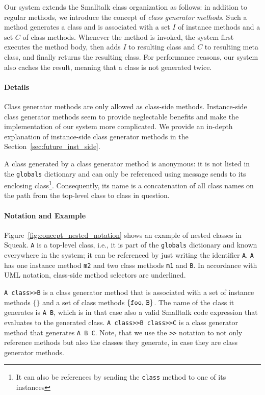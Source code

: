 Our system extends the Smalltalk class organization as follows: in addition to regular methods, we introduce the concept of \emph{class generator methods}. Such a method generates a class and is associated with a set $I$ of instance methods and a set $C$ of class methods. Whenever the method is invoked, the system first executes the method body, then adds $I$ to resulting class and $C$ to resulting meta class, and finally returns the resulting class. For performance reasons, our system also caches the result, meaning that a class is not generated twice.

\paragraph{Details}
Class generator methods are only allowed as class-side methods. Instance-side class generator methods seem to provide neglectable benefits and make the implementation of our system more complicated. We provide an in-depth explanation of instance-side class generator methods in the Section~\ref{sec:future_inst_side}.

A class generated by a class generator method is anonymous: it is not listed in the \texttt{globals} dictionary and can only be referenced using message sends to its enclosing class\footnote{It can also be references by sending the \texttt{class} method to one of its instances}. Consequently, its name is a concatenation of all class names on the path from the top-level class to class in question.


\paragraph{Notation and Example}
Figure~\ref{fig:concept_nested_notation} shows an example of nested classes in Squeak. \texttt{A} is a top-level class, i.e., it is part of the \texttt{globals} dictionary and known everywhere in the system; it can be referenced by just writing the identifier \texttt{A}. \texttt{A} has one instance method \texttt{m2} and two class methods \texttt{m1} and \texttt{B}. In accordance with UML notation, class-side method selectors are underlined. 

\texttt{A class>>B} is a class generator method that is associated with a set of instance methods $\{\}$ and a set of class methods $\{\mbox{\texttt{foo}, \texttt{B}}\}$. The name of the class it generates is \texttt{A B}, which is in that case also a valid Smalltalk code expression that evaluates to the generated class. \texttt{A class>>B class>>C} is a class generator method that generates \texttt{A B C}. Note, that we use the \texttt{>>} notation to not only reference methods but also the classes they generate, in case they are class generator methods.

